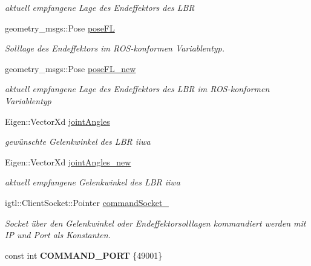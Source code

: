 \begin{DoxyCompactItemize}
\begin{DoxyCompactList}\small\item\em aktuell empfangene Lage des Endeffektors des L\-B\-R \end{DoxyCompactList}\item 
geometry\-\_\-msgs\-::\-Pose \hyperlink{classRosOpenIgtlBridge_a43a57e8fe72fa4a233b744a3576310da}{pose\-F\-L}
\begin{DoxyCompactList}\small\item\em Solllage des Endeffektors im R\-O\-S-\/konformen Variablentyp. \end{DoxyCompactList}\item 
geometry\-\_\-msgs\-::\-Pose \hyperlink{classRosOpenIgtlBridge_afee0e87dfe158f8980081554b3f8dac2}{pose\-F\-L\-\_\-new}
\begin{DoxyCompactList}\small\item\em aktuell empfangene Lage des Endeffektors des L\-B\-R im R\-O\-S-\/konformen Variablentyp \end{DoxyCompactList}\item 
\hypertarget{classRosOpenIgtlBridge_a4cb6ad04d4d51de2228ba529efb85a89}{Eigen\-::\-Vector\-Xd \hyperlink{classRosOpenIgtlBridge_a4cb6ad04d4d51de2228ba529efb85a89}{joint\-Angles}}\label{classRosOpenIgtlBridge_a4cb6ad04d4d51de2228ba529efb85a89}

\begin{DoxyCompactList}\small\item\em gewünschte Gelenkwinkel des L\-B\-R iiwa \end{DoxyCompactList}\item 
\hypertarget{classRosOpenIgtlBridge_a2fa9f49baaba81330c1d19967754738d}{Eigen\-::\-Vector\-Xd \hyperlink{classRosOpenIgtlBridge_a2fa9f49baaba81330c1d19967754738d}{joint\-Angles\-\_\-new}}\label{classRosOpenIgtlBridge_a2fa9f49baaba81330c1d19967754738d}

\begin{DoxyCompactList}\small\item\em aktuell empfangene Gelenkwinkel des L\-B\-R iiwa \end{DoxyCompactList}\item 
igtl\-::\-Client\-Socket\-::\-Pointer \hyperlink{classRosOpenIgtlBridge_a06df713358aa522ed6dd363d78bb8def}{command\-Socket\-\_\-}
\begin{DoxyCompactList}\small\item\em Socket über den Gelenkwinkel oder Endeffektorsolllagen kommandiert werden mit I\-P und Port als Konstanten. \end{DoxyCompactList}\item 
\hypertarget{classRosOpenIgtlBridge_a18105c3a5c5cbb4b71bb1ae5c9ee103b}{const int {\bfseries C\-O\-M\-M\-A\-N\-D\-\_\-\-P\-O\-R\-T} \{49001\}}\label{classRosOpenIgtlBridge_a18105c3a5c5cbb4b71bb1ae5c9ee103b}


\end{DoxyCompactItemize}
